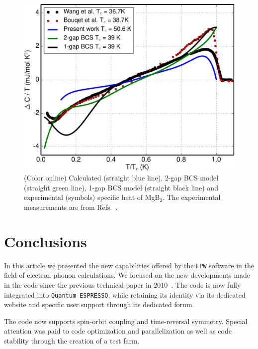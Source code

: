 \documentclass[final,3p,times,twocolumn]{elsarticle}
\newcounter{bla}
\begin{document}
\begin{figure}[t!]
  \centering
  \includegraphics[width=0.99\linewidth]{MgB2_specific_heat4.pdf}
  \caption{\label{specific-MgB2} (Color online) Calculated (straight blue line), 2-gap BCS model (straight green line), 1-gap BCS model (straight black line) and experimental (symbols) specific heat of MgB$_2$. The experimental measurements are from Refs.~\cite{Wang2001,Bouquet2001}. }
\end{figure}



\section{Conclusions}
\label{Conclusions}

In this article we presented the new capabilities offered by the \texttt{EPW} software in the field of electron-phonon calculations.
We focused on the new developments made in the code since the previous technical paper in 2010~\cite{Noffsinger2010}.  
The code is now fully integrated into \texttt{Quantum ESPRESSO}, while retaining its identity via its dedicated website and specific user support through its dedicated forum.

The code now supports spin-orbit coupling and time-reversal symmetry. Special attention was paid to code optimization and parallelization as well as code stability through the creation of a test farm. 
\end{document}
